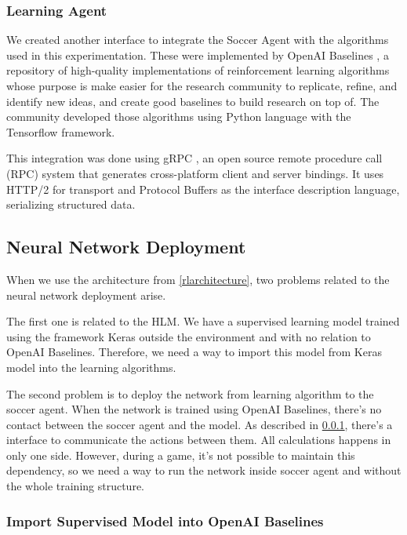 \subsubsection{Learning Agent}\label{learningagent}

We created another interface to integrate the Soccer Agent with the algorithms used in this experimentation. These were implemented by OpenAI Baselines \cite{baselines}, a repository of high-quality implementations of reinforcement learning algorithms whose purpose is make easier for the research community to replicate, refine, and identify new ideas, and create good baselines to build research on top of. The community developed those algorithms using Python language with the Tensorflow \cite{tensorflow2015-whitepaper} framework.

This integration was done using gRPC \cite{grpc}, an open source remote procedure call (RPC) system that generates cross-platform client and server bindings. It uses HTTP/2 for transport and Protocol Buffers \cite{protocolbuffers} as the interface description language, serializing structured data.




\subsection{Neural Network Deployment}

When we use the architecture from \ref{rlarchitecture}, two problems related to the neural network deployment arise.

The first one is related to the HLM. We have a supervised learning model trained using the framework Keras outside the environment and with no relation to OpenAI Baselines. Therefore, we need a way to import this model from Keras model into the learning algorithms.

The second problem is to deploy the network from learning algorithm to the soccer agent. When the network is trained using OpenAI Baselines, there's no contact between the soccer agent and the model. As described in \ref{learningagent}, there's a interface to communicate the actions between them. All calculations happens in only one side. However, during a game, it's not possible to maintain this dependency, so we need a way to run the network inside soccer agent and without the whole training structure.

\subsubsection{Import Supervised Model into OpenAI Baselines}

